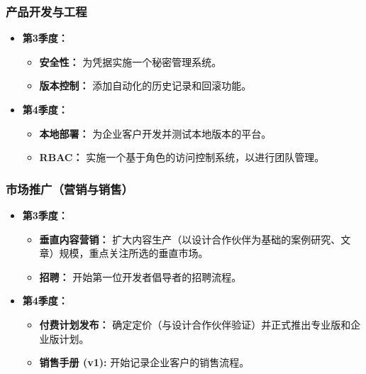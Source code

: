 \documentclass[11pt, a4paper, oneside]{article}
\begin{document}
\subsubsection*{产品开发与工程}
\begin{itemize}[leftmargin=*]
    \item \textbf{第3季度：}
    \begin{itemize}
        \item \textbf{安全性：} 为凭据实施一个秘密管理系统。
        \item \textbf{版本控制：} 添加自动化的历史记录和回滚功能。
    \end{itemize}
    \item \textbf{第4季度：}
    \begin{itemize}
        \item \textbf{本地部署：} 为企业客户开发并测试本地版本的平台。
        \item \textbf{RBAC：} 实施一个基于角色的访问控制系统，以进行团队管理。
    \end{itemize}
\end{itemize}

\subsubsection*{市场推广（营销与销售）}
\begin{itemize}[leftmargin=*]
    \item \textbf{第3季度：}
    \begin{itemize}
        \item \textbf{垂直内容营销：} 扩大内容生产（以设计合作伙伴为基础的案例研究、文章）规模，重点关注所选的垂直市场。
        \item \textbf{招聘：} 开始第一位开发者倡导者的招聘流程。
    \end{itemize}
    \item \textbf{第4季度：}
    \begin{itemize}
        \item \textbf{付费计划发布：} 确定定价（与设计合作伙伴验证）并正式推出专业版和企业版计划。




\item \textbf{销售手册 (v1):} 开始记录企业客户的销售流程。
    \end{itemize}
\end{itemize}
\end{document}
